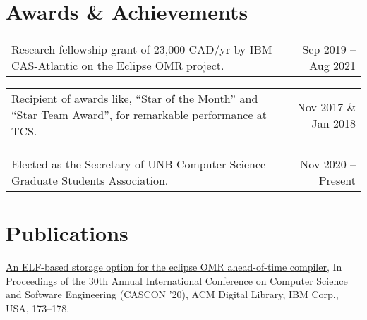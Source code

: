 \documentclass[letterpaper,10pt]{article}
\makeatletter
\newcommand{\resumeItem}[1]{
  \item\small{
    {#1 \vspace{-2pt}}
  }
}
\newcommand{\resumeAch}[2]{
    \begin{tabular*}{0.97\textwidth}[t]{l@{\extracolsep{\fill}}r}
    {\small#1} & #2 \\
    \end{tabular*}\vspace{-0pt}
}
\newcommand{\resumeItemListStart}{\begin{itemize}}
\newcommand{\resumeItemListEnd}{\end{itemize}\vspace{-5pt}}
\makeatother
\begin{document}
%
\section{Awards \& Achievements}
  \resumeAch
    {Research fellowship grant of 23,000 CAD/yr by IBM CAS-Atlantic on the Eclipse OMR project.}{Sep 2019 -- Aug 2021}
  \resumeAch
    {Recipient of awards like, ``Star of the Month'' and ``Star Team Award'', for remarkable performance at TCS.}{ Nov 2017 \& Jan 2018}
  \resumeAch
    {Elected as the Secretary of UNB Computer Science Graduate Students Association.}{Nov 2020 -- Present}
%


%
\section{Publications}
 \begin{itemize}[leftmargin=0.15in, label={}]
    \small{\item{
      \href{https://dl.acm.org/doi/abs/10.5555/3432601.3432624}{\underline{{An ELF-based storage option for the eclipse OMR ahead-of-time compiler,}}}{ In Proceedings of the 30th Annual International Conference on Computer Science and Software Engineering (CASCON '20), ACM Digital Library, IBM Corp., USA, 173–178.} 
     }}
 \end{itemize}


\end{document}
